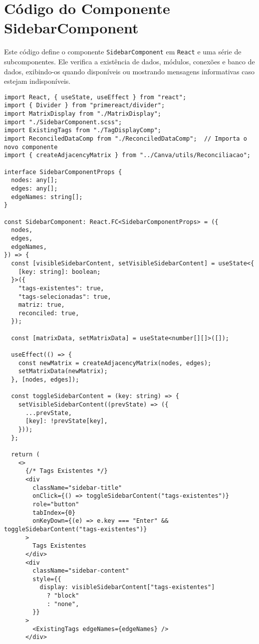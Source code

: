 \chapter{Código do Componente SidebarComponent}
\label{Anexo:CodigoSidebar}

Este código define o componente \texttt{SidebarComponent} em \texttt{React} e uma série de subcomponentes. Ele verifica a existência de dados, módulos, conexões e banco de dados, exibindo-os quando disponíveis ou mostrando mensagens informativas caso estejam indisponíveis.

\begin{verbatim}
import React, { useState, useEffect } from "react";
import { Divider } from "primereact/divider"; 
import MatrixDisplay from "./MatrixDisplay";
import "./SidebarComponent.scss";
import ExistingTags from "./TagDisplayComp";
import ReconciledDataComp from "./ReconciledDataComp";  // Importa o novo componente
import { createAdjacencyMatrix } from "../Canva/utils/Reconciliacao";

interface SidebarComponentProps {
  nodes: any[];
  edges: any[];
  edgeNames: string[]; 
}

const SidebarComponent: React.FC<SidebarComponentProps> = ({
  nodes,
  edges,
  edgeNames,
}) => {
  const [visibleSidebarContent, setVisibleSidebarContent] = useState<{
    [key: string]: boolean;
  }>({
    "tags-existentes": true,
    "tags-selecionadas": true,
    matriz: true,
    reconciled: true,
  });

  const [matrixData, setMatrixData] = useState<number[][]>([]);

  useEffect(() => {
    const newMatrix = createAdjacencyMatrix(nodes, edges);
    setMatrixData(newMatrix);
  }, [nodes, edges]);

  const toggleSidebarContent = (key: string) => {
    setVisibleSidebarContent((prevState) => ({
      ...prevState,
      [key]: !prevState[key],
    }));
  };

  return (
    <>
      {/* Tags Existentes */}
      <div
        className="sidebar-title"
        onClick={() => toggleSidebarContent("tags-existentes")}
        role="button"
        tabIndex={0}
        onKeyDown={(e) => e.key === "Enter" && toggleSidebarContent("tags-existentes")}
      >
        Tags Existentes
      </div>
      <div
        className="sidebar-content"
        style={{
          display: visibleSidebarContent["tags-existentes"]
            ? "block"
            : "none",
        }}
      >
        <ExistingTags edgeNames={edgeNames} />
      </div>


\end{verbatim}
